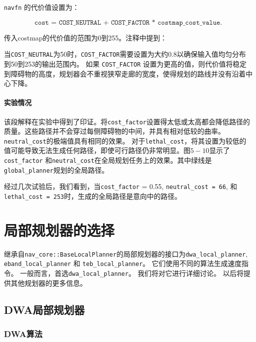 \texttt{navfn} 的代价值设置为：

$$\texttt{cost = COST\_NEUTRAL + COST\_FACTOR * costmap\_cost\_value.}$$

传入costmap的代价值的范围为0到255。注释中提到：
\begin{displayquote} 
	当\texttt{COST_NEUTRAL}为50时，\texttt{COST_FACTOR}需要设置为大约0.8以确保输入值均匀分布到50到253的输出范围内。
	如果 \texttt{COST_FACTOR} 设置为更高的值，则代价值将稳定到障碍物的高度，规划器会不重视狭窄走廊的宽度，使得规划的路线并没有沿着中心下降。
\end{displayquote}

\paragraph[Experiment observations]{实验情况} %
该段解释在实验中得到了印证。将\texttt{cost_factor}设置得太低或太高都会降低路径的质量。这些路径并不会穿过每侧障碍物的中间，并具有相对低较的曲率。
\texttt{neutral_cost}的极端值具有相同的效果。
对于\texttt{lethal_cost}，将其设置为较低的值可能导致无法生成任何路径，即使可行路径仍非常明显。图$5-10$显示了\texttt{cost_factor} 和\texttt{neutral_cost}在全局规划任务上的效果。其中绿线是\texttt{global_planner}规划的全局路径。

经过几次试验后，我们看到，当\texttt{cost_factor} = 0.55, \texttt{neutral_cost = 66}, 和 \texttt{lethal_cost = 253}时，生成的全局路径是意向中的路径。

\section[Local Planner Selection]{局部规划器的选择}

继承自\texttt{nav_core::BaseLocalPlanner}的局部规划器的接口为\texttt{dwa_local_planner}, \texttt{eband_local_planner} 和 \texttt{teb_local_planner}。
它们使用不同的算法生成速度指令。
一般而言，首选\texttt{dwa_local_planner}。
我们将对它进行详细讨论。
以后将提供其他规划器的更多信息。

\subsection[DWA Local Planner]{DWA局部规划器}
\subsubsection[DWA algorithm]{DWA算法}

